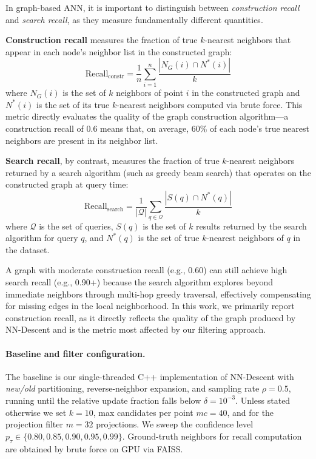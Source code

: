 In graph-based ANN, it is important to distinguish between \emph{construction recall} and \emph{search recall}, as they measure fundamentally different quantities.

\textbf{Construction recall} measures the fraction of true $k$-nearest neighbors that appear in each node's neighbor list in the constructed graph:
\begin{equation}
    \text{Recall}_{\text{constr}} = \frac{1}{n} \sum_{i=1}^{n} \frac{|N_G(i) \cap N^*(i)|}{k}
    \label{eq:construction_recall}
\end{equation}
where $N_G(i)$ is the set of $k$ neighbors of point $i$ in the constructed graph and $N^*(i)$ is the set of its true $k$-nearest neighbors computed via brute force.
This metric directly evaluates the quality of the graph construction algorithm---a construction recall of 0.6 means that, on average, 60\% of each node's true nearest neighbors are present in its neighbor list.

\textbf{Search recall}, by contrast, measures the fraction of true $k$-nearest neighbors returned by a search algorithm (such as greedy beam search) that operates on the constructed graph at query time:
\begin{equation}
    \text{Recall}_{\text{search}} = \frac{1}{|\mathcal{Q}|} \sum_{q \in \mathcal{Q}} \frac{|S(q) \cap N^*(q)|}{k}
    \label{eq:search_recall}
\end{equation}
where $\mathcal{Q}$ is the set of queries, $S(q)$ is the set of $k$ results returned by the search algorithm for query $q$, and $N^*(q)$ is the set of true $k$-nearest neighbors of $q$ in the dataset.

A graph with moderate construction recall (e.g., 0.60) can still achieve high search recall (e.g., 0.90+) because the search algorithm explores beyond immediate neighbors through multi-hop greedy traversal, effectively compensating for missing edges in the local neighborhood.
In this work, we primarily report construction recall, as it directly reflects the quality of the graph produced by NN-Descent and is the metric most affected by our filtering approach.

\paragraph{Baseline and filter configuration.}
The baseline is our single-threaded C++ implementation of NN-Descent with \emph{new/old} partitioning, reverse-neighbor expansion, and sampling rate $\rho = 0.5$, running until the relative update fraction falls below $\delta = 10^{-3}$.
Unless stated otherwise we set $k = 10$, max candidates per point $mc = 40$, and for the projection filter $m = 32$ projections.
We sweep the confidence level $p_\tau \in \{0.80, 0.85, 0.90, 0.95, 0.99\}$.
Ground-truth neighbors for recall computation are obtained by brute force on GPU via FAISS.

